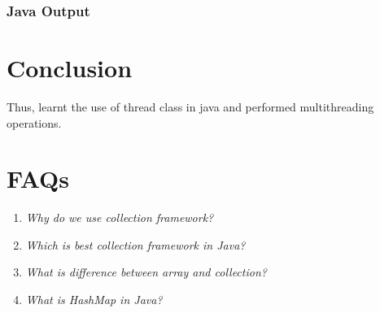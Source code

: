 \documentclass[11pt]{article}
\begin{document}


\subsubsection{Java Output}



\section{Conclusion}
Thus, learnt the use of thread class in java and performed multithreading operations.

\pagebreak

\section{FAQs}

\begin{enumerate}
	\item \textit{Why do we use collection framework?}
	
	\item \textit{Which is best collection framework in Java?}
	
	\item \textit{What is difference between array and collection?}
	
	\item \textit{What is HashMap in Java?}
	
\end{enumerate}
\end{document}
